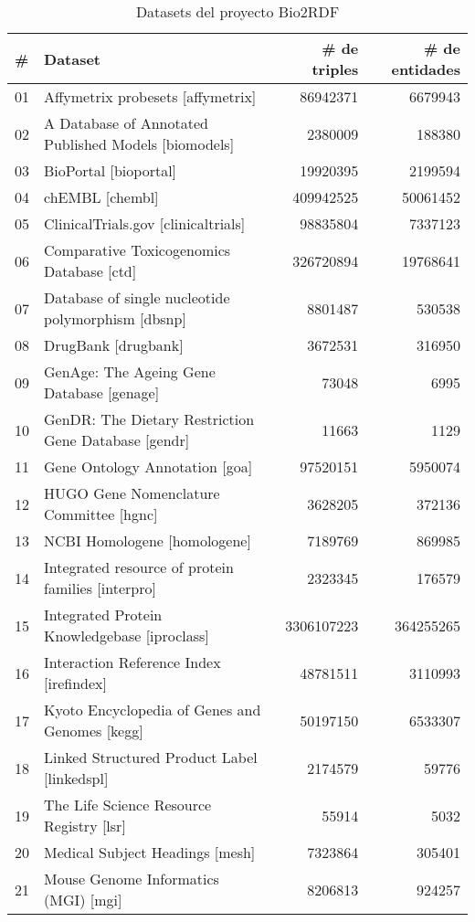 \begin{table}[]
\centering
\caption{Datasets del proyecto Bio2RDF}
\label{tab:bio2RDFdataset}
\begin{tabular}{|l|l|r|r|}
  \hline
  \bf{\#} & \bf{Dataset} & \bf{\# de triples} & \bf{\# de entidades} \\\hline
  01 & Affymetrix probesets [affymetrix] & 86942371 & 6679943\\\hline
  02 & A Database of Annotated Published Models [biomodels] & 2380009 & 188380\\\hline
  03 & BioPortal [bioportal] & 19920395 & 2199594\\\hline
  04 & chEMBL [chembl] & 409942525 & 50061452\\\hline
  05 & ClinicalTrials.gov [clinicaltrials] & 98835804 & 7337123\\\hline
  06 & Comparative Toxicogenomics Database [ctd] & 326720894 & 19768641\\\hline
  07 & Database of single nucleotide polymorphism [dbsnp] & 8801487 & 530538\\\hline
  08 & DrugBank [drugbank] & 3672531 & 316950\\\hline
  09 & GenAge: The Ageing Gene Database [genage] & 73048 & 6995\\\hline
  10 & GenDR: The Dietary Restriction Gene Database [gendr] & 11663 & 1129\\\hline
  11 & Gene Ontology Annotation [goa] & 97520151 & 5950074\\\hline
  12 & HUGO Gene Nomenclature Committee [hgnc] & 3628205 & 372136\\\hline
  13 & NCBI Homologene [homologene] & 7189769 & 869985\\\hline
  14 & Integrated resource of protein families [interpro] & 2323345 & 176579\\\hline
  15 & Integrated Protein Knowledgebase [iproclass] & 3306107223 & 364255265\\\hline
  16 & Interaction Reference Index [irefindex] & 48781511 & 3110993\\\hline
  17 & Kyoto Encyclopedia of Genes and Genomes [kegg] & 50197150 & 6533307\\\hline
  18 & Linked Structured Product Label [linkedspl] & 2174579 & 59776\\\hline
  19 & The Life Science Resource Registry [lsr] & 55914 & 5032\\\hline
  20 & Medical Subject Headings [mesh] & 7323864 & 305401\\\hline
  21 & Mouse Genome Informatics (MGI) [mgi] & 8206813 & 924257\\\hline

\end{tabular}
\end{table}
